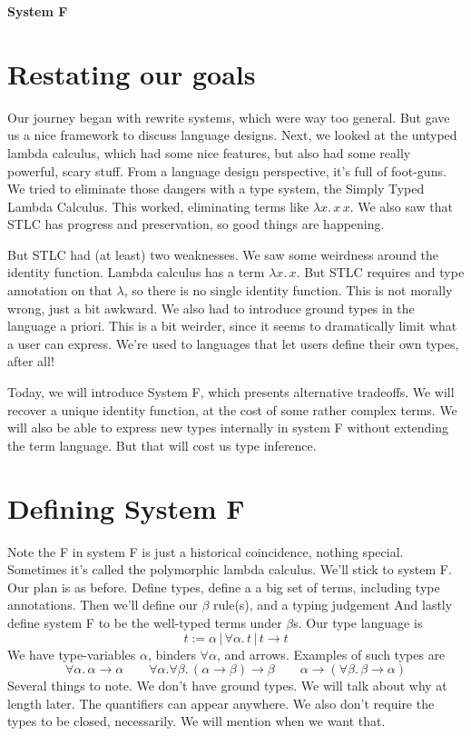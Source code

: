 \documentclass[12pt]{article}
\begin{document}
\baselineskip 12pt

\begin{center}
\textbf{\Large System F} \\
\end{center}

\section{Restating our goals}
Our journey began with rewrite systems, which were way too general.
But gave us a nice framework to discuss language designs. 
Next, we looked at the untyped lambda calculus, which had some nice features, but also had some really powerful, scary stuff.
From a language design perspective, it's full of foot-guns.
We tried to eliminate those dangers with a type system, the Simply Typed Lambda Calculus.
This worked, eliminating terms like $\lambda x.\, x\, x$. 
We also saw that STLC has progress and preservation, so good things are happening.

But STLC had (at least) two weaknesses.
We saw some weirdness around the identity function.
Lambda calculus has a term $\lambda x.\, x$.
But STLC requires and type annotation on that $\lambda$, so there is no single identity function. This is not morally wrong, just a bit awkward.
We also had to introduce ground types in the language a priori.
This is a bit weirder, since it seems to dramatically limit what a user can express.
We're used to languages that let users define their own types, after all!

Today, we will introduce System F, which presents alternative tradeoffs.
We will recover a unique identity function, at the cost of some rather complex terms.
We will also be able to express new types internally in system F without extending the term language. 
But that will cost us type inference.

\section{Defining System F}

Note the F in system F is just a historical coincidence, nothing special.
Sometimes it's called the polymorphic lambda calculus.
We'll stick to system F.
Our plan is as before.
Define types, define a a big set of terms, including type annotations.
Then we'll define our $\beta$ rule(s), and a typing judgement
And lastly define system F to be the well-typed terms under $\beta$s.
Our type language is 
\[
  t := \alpha \,|\, \forall \alpha.\, t \,|\,  t \rightarrow t
\]
We have type-variables $\alpha$, binders $\forall \alpha$, and arrows.
Examples of such types are 
\[
  \forall \alpha.\, \alpha \rightarrow \alpha \quad\quad \forall \alpha.\forall \beta.\,
    (\alpha \rightarrow \beta) \rightarrow \beta
  \quad\quad
  \alpha \rightarrow (\forall \beta.\, \beta \rightarrow \alpha)
\]
Several things to note. 
We don't have ground types.
We will talk about why at length later.
The quantifiers can appear anywhere.
We also don't require the types to be closed, necessarily. We will mention when we want that.
\end{document}
